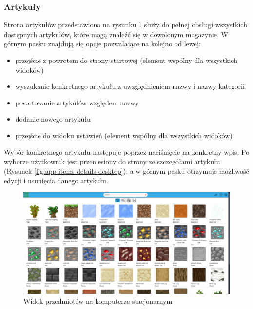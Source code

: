 \documentclass[../main.tex]{subfiles}
\begin{document}
        \FloatBarrier 
        \subsubsection{Artykuły}
            Strona artykułów przedstawiona na rysunku \ref{fig:app-items-desktop} służy do pełnej obsługi wszystkich dostępnych artykułów, które mogą znaleźć się w dowolonym magazynie. W górnym pasku znajdują się opcje pozwalające na kolejno od lewej:
            \begin{itemize}
                \item przejście z powrotem do strony startowej (element wspólny dla wszystkich widoków)
                \item wyszukanie konkretnego artykułu z uwzględnieniem nazwy i nazwy kategorii
                \item posortowanie artykułów względem nazwy
                \item dodanie nowego artykułu
                \item przejście do widoku ustawień (element wspólny dla wszystkich widoków)
            \end{itemize}
            Wybór konkretnego artykułu następuje poprzez naciśnięcie na konkretny wpis. Po wyborze użytkownik jest przeniesiony do strony ze szczegółami artykułu (Rysunek \ref{fig:app-items-details-desktop}), a w górnym pasku otrzymuje możliwość edycji i usunięcia danego artykułu. 
            
            \begin{figure}[H]
                \centering
                \includegraphics[width=\getImageWidth]{images/app-desktop/app-items-desktop.png}
                \caption{Widok przedmiotów na komputerze stacjonarnym}
                \label{fig:app-items-desktop}
            \end{figure}
            
\end{document}
